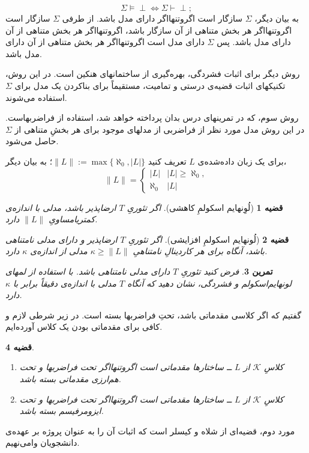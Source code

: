 \documentclass[12pt,a4paper]{article}
\theoremstyle{colorhead}
\newtheorem{thm}{قضیه}
\newtheorem{tam}[thm]{تمرین}
\begin{document}
\[
\Sigma\models \perp \Leftrightarrow \Sigma\vdash \perp;
\]
به بیان دیگر،
$\Sigma$
سازگار 
است اگروتنهااگر دارای مدل باشد.  از طرفی 
$\Sigma$
سازگار است 
اگروتنهااگر هر بخش متناهی از آن سازگار باشد، اگروتنهااگر هر بخش متناهی از آن دارای مدل باشد. پس 
$\Sigma$
دارای مدل است اگروتنهااگر هر بخش متناهی از آن دارای مدل باشد.
\par 
روش دیگر برای اثبات فشردگی، بهره‌گیری از ساختمانهای هنکین
 است.  در این روش، تکنیکهای اثبات قضیه‌ی درستی و تمامیت، مستقیماً برای بناکردن یک مدل برای
$\Sigma$
استفاده می‌شوند. 
\par 
روش سوم، که در تمرینهای درس بدان پرداخته خواهد شد، استفاده از فراضربهاست. در این روش مدل مورد نظر از فراضربی از
مدلهای موجود برای هر بخشِ متناهی 
از
$\Sigma$
حاصل می‌شود.
\par 
برای یک زبان داده‌شده‌ی 
$L$
تعریف 
کنید
$\|L\|:=\max\{\aleph_0,|L|\}$؛
به بیان دیگر،
\[
\|L\|=\begin{cases}
|L| & |L|\geq \aleph_0,
\\
\aleph_0 & |L|
\end{cases}
\]
\begin{thm}[لُوِنهایم اسکولمِ کاهشی]
اگر تئوریِ
$T$
ارضاپذیر باشد،  مدلی با اندازه‌ی کمتریامساویِ
$\|L\|$
دارد. 
\end{thm}
\begin{thm}[لُونهایم اسکولمِ افزایشی]
اگر تئوریِ
$T$
ارضاپذیر 
و دارای مدلی نامتناهی باشد،
آنگاه برای هر کاردینالِ نامتناهیِ 
$\kappa\geq \|L\|$
مدلی از اندازه‌ی
$\kappa$
دارد. 
\end{thm}
\begin{tam}
فرض کنید تئوریِ
$T$
 دارای 
 مدلی نامتناهی باشد. با استفاده از لمهای لونهایم‌اسکولم و فشردگی، نشان دهید که 
 آنگاه 
 $T$
 مدلی با اندازه‌ی
دقیقاً
برابر با
$\kappa$
 دارد. 
\end{tam}
گفتیم که اگر کلاسی مقدماتی باشد، تحتِ فراضربها بسته است. در زیر شرطی لازم و کافی برای مقدماتی بودن یک کلاس آورده‌ایم.
\begin{thm}
\hfill
\begin{enumerate}
\item 
کلاسِ
$\mathcal{K}$
از
$L$  ــ‌
ساختارها مقدماتی است اگروتنهااگر تحت فراضربها و تحت هم‌ارزی مقدماتی بسته باشد.
\item 
کلاسِ
$\mathcal{K}$
از
$L$  ــ‌
ساختارها مقدماتی است اگروتنهااگر تحت فراضربها و تحت ایزومرفیسم بسته باشد.
\end{enumerate}
\end{thm}
مورد دوم، قضیه‌ای از شلاه و کیسلر 
است که اثبات آن را به عنوان پروژه بر عهده‌ی دانشجویان وامی‌نهیم. 
\end{document}
